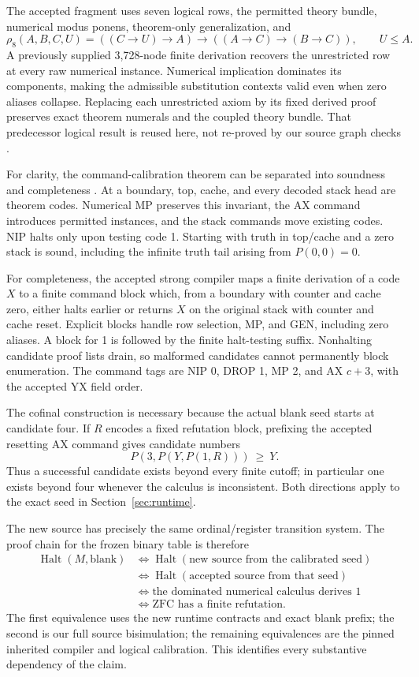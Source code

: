 \documentclass[11pt]{article}
\newcommand{\Halt}{\operatorname{Halt}}
\begin{document}
The accepted fragment uses seven logical rows, the permitted theory
bundle, numerical modus ponens, theorem-only generalization, and
\[
 \rho_8(A,B,C,U)=((C\to U)\to A)\to((A\to C)\to(B\to C)),
 \qquad U\leq A.
\]
A previously supplied 3,728-node finite derivation recovers the
unrestricted row at every raw numerical instance. Numerical implication
dominates its components, making the admissible substitution contexts
valid even when zero aliases collapse. Replacing each unrestricted
axiom by its fixed derived proof preserves exact theorem numerals and
the coupled theory bundle. That predecessor logical result is reused
here, not re-proved by our source graph checks \cite{dominated}.

For clarity, the command-calibration theorem can be separated into
soundness and completeness \cite{permuted}. At a boundary, top, cache,
and every decoded stack head are theorem codes. Numerical MP preserves
this invariant, the AX command introduces permitted instances, and the
stack commands move existing codes. NIP halts only upon testing code 1.
Starting with truth in top/cache and a zero stack is sound, including
the infinite truth tail arising from $P(0,0)=0$.

For completeness, the accepted strong compiler maps a finite derivation
of a code $X$ to a finite command block which, from a boundary with
counter and cache zero, either halts earlier or returns $X$ on the
original stack with counter and cache reset. Explicit
blocks handle row selection, MP, and GEN, including zero aliases.
A block for 1 is followed by the finite halt-testing suffix. Nonhalting
candidate proof lists drain, so malformed candidates cannot permanently
block enumeration. The command tags are NIP 0, DROP 1, MP 2, and AX
$c+3$, with the accepted YX field order.

The cofinal construction is necessary because the actual blank seed
starts at candidate four. If $R$ encodes a fixed refutation block,
prefixing the accepted resetting AX command gives candidate numbers
\[
                P(3,P(Y,P(1,R)))\ \geq\ Y.
\]
Thus a successful candidate exists beyond every finite cutoff; in
particular one exists beyond four whenever the calculus is inconsistent.
Both directions apply to the exact seed in Section~\ref{sec:runtime}.

The new source has precisely the same ordinal/register transition
system. The proof chain for the frozen binary table is therefore
\[
\begin{aligned}
\Halt(M,\mathrm{blank})
&\iff \Halt(\text{new source from the calibrated seed})\\
&\iff \Halt(\text{accepted source from that seed})\\
&\iff \text{the dominated numerical calculus derives }1\\
&\iff \text{ZFC has a finite refutation}.
\end{aligned}
\]
The first equivalence uses the new runtime contracts and exact blank
prefix; the second is our full source bisimulation; the remaining
equivalences are the pinned inherited compiler and logical calibration.
This identifies every substantive dependency of the claim.
\end{document}
